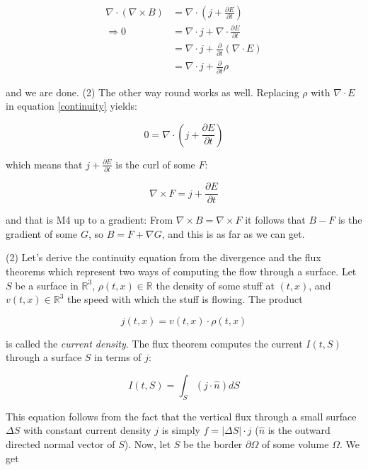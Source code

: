 \documentclass{article}
\begin{document}
\begin{align*}
\nabla \cdot (\nabla \times B) &= \nabla \cdot (j + \frac{\partial E}{\partial t}) \\
\Rightarrow 0 &= \nabla \cdot j + \nabla \cdot \frac{\partial E}{\partial t} \\
&=  \nabla \cdot j + \frac{\partial}{\partial t} (\nabla \cdot E) \\
&=  \nabla \cdot j + \frac{\partial}{\partial t} \rho          
\end{align*}

and we are done. (2) The other way round works as well. Replacing $\rho$ with $\nabla \cdot E$ in equation \ref{continuity} yields:

\begin{equation*}
0 = \nabla \cdot (j + \frac{\partial E}{\partial t})
\end{equation*}

which means that $j + \frac{\partial E}{\partial t}$ is the curl of some $F$:

\begin{equation}
\nabla \times F = j + \frac{\partial E}{\partial t}
\end{equation}

and that is M4 up to a gradient: From $\nabla \times B = \nabla \times F$ it follows that $B - F$ is the gradient of some $G$, so $B = F + \nabla G$, and this is as far as we can get.

(2) Let's derive the continuity equation from the divergence and the flux theorems which represent two ways of computing the flow through a surface. Let $S$ be a surface in $\mathbb{R}^3$, $\rho(t, x) \in \mathbb{R}$ the density of some stuff at $(t, x)$, and $v(t, x) \in \mathbb{R}^3$ the speed with which the stuff is flowing. The product 

\begin{equation}
j(t, x) = v(t, x) \cdot \rho(t, x)
\end{equation}

is called the \emph{current density}. The flux theorem computes the current $I(t, S)$ through a surface $S$ in terms of $j$:

\begin{equation} \label{flux}
I(t, S) = \int_{S} (j \cdot \hat{n}) dS
\end{equation}

This equation follows from the fact that the vertical flux through a small surface $\Delta S$ with constant current density $j$ is simply $f = | \Delta S| \cdot j $ ($\hat n$ is the outward directed normal vector of $S$). Now, let $S$ be the border  $\partial \Omega$ of some volume $\Omega$. We get
\end{document}
